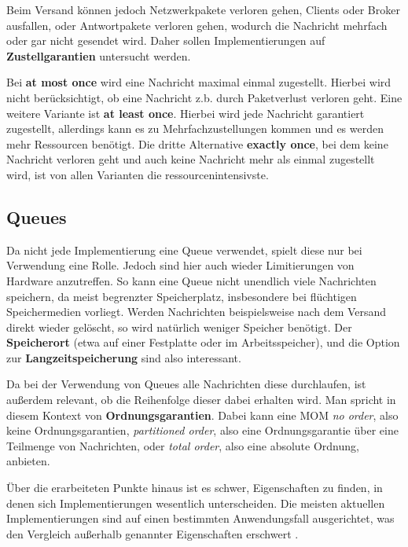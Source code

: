 Beim Versand können jedoch Netzwerkpakete verloren gehen, Clients oder Broker
ausfallen, oder Antwortpakete verloren gehen, wodurch die Nachricht mehrfach
oder gar nicht gesendet wird. Daher sollen Implementierungen auf
\textbf{Zustellgarantien} untersucht werden.

Bei \textbf{at most once} wird eine Nachricht maximal einmal zugestellt.
Hierbei wird nicht berücksichtigt, ob eine Nachricht z.b. durch
Paketverlust verloren geht. Eine weitere Variante ist
\textbf{at least once}. Hierbei wird jede Nachricht garantiert zugestellt,
allerdings kann es zu Mehrfachzustellungen kommen und es werden mehr Ressourcen
benötigt. Die dritte Alternative \textbf{exactly once}, bei dem
keine Nachricht verloren geht und auch keine Nachricht mehr als einmal zugestellt wird,
ist von allen Varianten die ressourcenintensivste. \cite{dobbelaere2017kafka}

\subsection{Queues}
Da nicht jede Implementierung eine Queue verwendet, spielt diese nur bei Verwendung
eine Rolle. Jedoch sind hier auch wieder Limitierungen von Hardware anzutreffen.
So kann eine Queue nicht  unendlich viele Nachrichten speichern, da
meist begrenzter Speicherplatz, insbesondere bei flüchtigen Speichermedien vorliegt.
Werden Nachrichten beispielsweise nach dem Versand direkt wieder gelöscht, so wird
natürlich weniger Speicher benötigt.
Der \textbf{Speicherort} (etwa auf einer Festplatte oder im Arbeitsspeicher),
und die Option zur \textbf{Langzeitspeicherung} sind also interessant.

Da bei der Verwendung von Queues alle Nachrichten diese durchlaufen, ist
außerdem relevant, ob die Reihenfolge dieser dabei erhalten wird. Man spricht
in diesem Kontext von \textbf{Ordnungsgarantien}. Dabei kann eine MOM
\textit{no order}, also keine Ordnungsgarantien, \textit{partitioned order}, also eine 
Ordnungsgarantie über eine Teilmenge von Nachrichten, oder \textit{total order},
also eine absolute Ordnung, anbieten. \cite{dobbelaere2017kafka}

Über die erarbeiteten Punkte hinaus ist es schwer, Eigenschaften zu finden,
in denen sich Implementierungen wesentlich unterscheiden. Die meisten aktuellen
Implementierungen sind auf einen bestimmten Anwendungsfall ausgerichtet, was den
Vergleich außerhalb genannter Eigenschaften erschwert \cite{kleppmann2017designing}.


